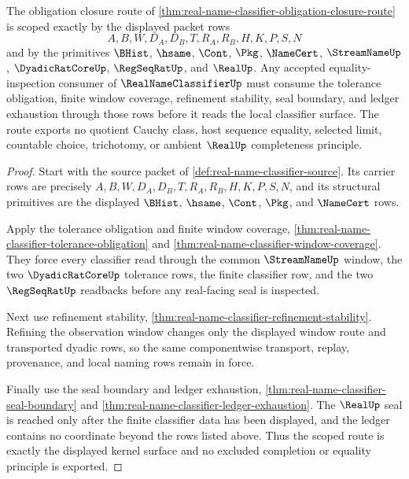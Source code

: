 \begin{theorem}
\label{thm:real-name-classifier-scope-route}
The obligation closure route of \autoref{thm:real-name-classifier-obligation-closure-route} is scoped exactly by the displayed packet rows
$$
A,B,W,D_A,D_B,T,R_A,R_B,H,K,P,S,N
$$
and by the primitives $\BHist$, $\hsame$, $\Cont$, $\Pkg$, $\NameCert$, $\StreamNameUp$, $\DyadicRatCoreUp$, $\RegSeqRatUp$, and $\RealUp$. Any accepted equality-inspection consumer of $\RealNameClassifierUp$ must consume the tolerance obligation, finite window coverage, refinement stability, seal boundary, and ledger exhaustion through those rows before it reads the local classifier surface. The route exports no quotient Cauchy class, host sequence equality, selected limit, countable choice, trichotomy, or ambient $\RealUp$ completeness principle.
\end{theorem}
\begin{proof}
Start with the source packet of \autoref{def:real-name-classifier-source}. Its carrier rows are precisely $A,B,W,D_A,D_B,T,R_A,R_B,H,K,P,S,N$, and its structural primitives are the displayed $\BHist$, $\hsame$, $\Cont$, $\Pkg$, and $\NameCert$ rows.

Apply the tolerance obligation and finite window coverage, \autoref{thm:real-name-classifier-tolerance-obligation} and \autoref{thm:real-name-classifier-window-coverage}. They force every classifier read through the common $\StreamNameUp$ window, the two $\DyadicRatCoreUp$ tolerance rows, the finite classifier row, and the two $\RegSeqRatUp$ readbacks before any real-facing seal is inspected.

Next use refinement stability, \autoref{thm:real-name-classifier-refinement-stability}. Refining the observation window changes only the displayed window route and transported dyadic rows, so the same componentwise transport, replay, provenance, and local naming rows remain in force.

Finally use the seal boundary and ledger exhaustion, \autoref{thm:real-name-classifier-seal-boundary} and \autoref{thm:real-name-classifier-ledger-exhaustion}. The $\RealUp$ seal is reached only after the finite classifier data has been displayed, and the ledger contains no coordinate beyond the rows listed above. Thus the scoped route is exactly the displayed kernel surface and no excluded completion or equality principle is exported.
\end{proof}

